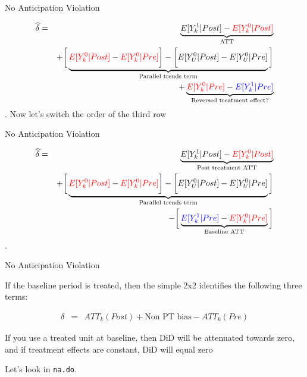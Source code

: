 \documentclass{beamer}
\begin{document}
\begin{frame}{No Anticipation Violation}

\begin{eqnarray*}
\widehat{\delta} &=& \underbrace{E[Y^1_k | Post] - \textcolor{red}{E[Y^0_k | Post]}}_{\mathclap{\text{ATT}}} \\
&& + \bigg [  \underbrace{\textcolor{red}{E[Y^0_k | Post]} - \textcolor{red}{E[Y^0_k | Pre]} \bigg ] - \bigg [ \textcolor{black}{E[Y^0_U | Post]} - E[Y_U^0 | Pre] }_{\mathclap{\text{Parallel trends term}}} \bigg ] \\
&& + \underbrace{ \textcolor{red}{E[Y^0_k|Pre]} - \textcolor{blue}{E[Y^1_k|Pre]}}_{\mathclap{\text{Reversed treatment effect?}}}
\end{eqnarray*}. Now let's switch the order of the third row

\end{frame}

\begin{frame}{No Anticipation Violation}

\begin{eqnarray*}
\widehat{\delta} &=& \underbrace{E[Y^1_k | Post] - \textcolor{red}{E[Y^0_k | Post]}}_{\mathclap{\text{Post treatment ATT}}} \\
&& + \bigg [  \underbrace{\textcolor{red}{E[Y^0_k | Post]} - \textcolor{red}{E[Y^0_k | Pre]} \bigg ] - \bigg [ \textcolor{black}{E[Y^0_U | Post]} - E[Y_U^0 | Pre] }_{\mathclap{\text{Parallel trends term}}} \bigg ] \\
&& - \bigg [ \underbrace{ \textcolor{blue}{E[Y^1_k|Pre]} - \textcolor{red}{E[Y^0_k|Pre]}}_{\mathclap{\text{Baseline ATT}}} \bigg ]
\end{eqnarray*}. 

\end{frame}





\begin{frame}{No Anticipation Violation}

If the baseline period is treated, then the simple 2x2 identifies the following three terms:

\begin{eqnarray*}
\delta &=& ATT_k(Post) + \text{Non PT bias}  - ATT_k(Pre)
\end{eqnarray*}

If you use a treated unit at baseline, then DiD will be attenuated towards zero, and if treatment effects are constant, DiD will equal zero

\bigskip 

Let's look in \texttt{na.do}.

\end{frame}
\end{document}
